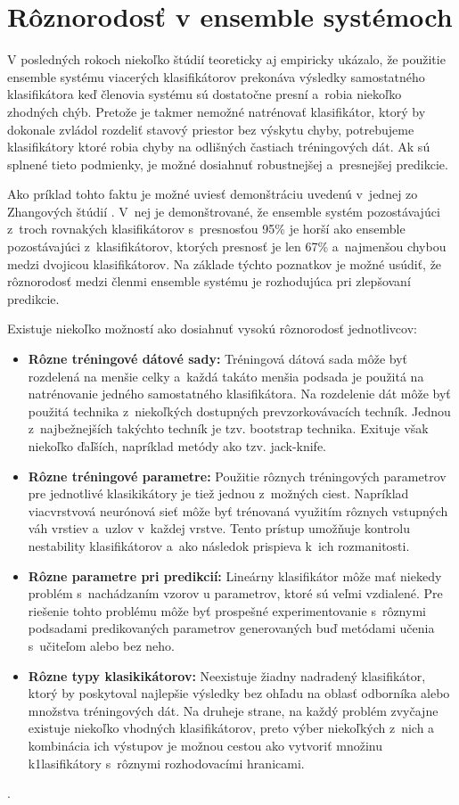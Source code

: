 \section{Rôznorodosť v ensemble systémoch}

V posledných rokoch niekoľko štúdií teoreticky \cite{teoret1} aj empiricky \cite{empiric1} ukázalo, že použitie ensemble systému viacerých klasifikátorov prekonáva výsledky samostatného klasifikátora keď členovia systému sú dostatočne presní a~robia niekoľko zhodných chýb. 
Pretože je takmer nemožné natrénovať klasifikátor, ktorý by dokonale zvládol rozdeliť stavový priestor bez výskytu chyby, potrebujeme klasifikátory ktoré robia chyby na odlišných častiach tréningových dát. Ak sú splnené tieto podmienky, je možné dosiahnuť robustnejšej a~presnejšej predikcie. 

Ako príklad tohto faktu je možné uviesť demonštráciu uvedenú v~jednej zo Zhangových štúdií \cite{zhang}. V~nej je demonštrované, že ensemble systém pozostávajúci z~troch rovnakých klasifikátorov s~presnosťou 95\% je horší ako ensemble pozostávajúci z~klasifikátorov, ktorých presnosť je len 67\% a~najmenšou chybou medzi dvojicou klasifikátorov. Na základe týchto poznatkov je možné usúdiť, že rôznorodosť medzi členmi ensemble systému je rozhodujúca pri zlepšovaní predikcie.

Existuje niekoľko možností ako dosiahnuť vysokú rôznorodosť jednotlivcov:
\begin{itemize}
	\item \textbf{Rôzne tréningové dátové sady:} Tréningová dátová sada môže byť rozdelená na menšie celky a~každá takáto menšia podsada je použitá na natrénovanie jedného samostatného klasifikátora. Na rozdelenie dát môže byť použitá technika z~niekoľkých dostupných prevzorkovávacích techník. Jednou z~najbežnejších takýchto techník je tzv. bootstrap technika. Exituje však niekoľko ďaľších, napríklad metódy ako tzv. jack-knife.
	\item \textbf{Rôzne tréningové parametre:} Použitie rôznych tréningových parametrov pre jednotlivé klasikikátory je tiež jednou z~možných ciest. Napríklad viacvrstvová neurónová sieť môže byť trénovaná využitím rôznych vstupných váh vrstiev a~uzlov v~každej vrstve. Tento prístup umožňuje kontrolu nestability klasifikátorov a~ako následok prispieva k~ich rozmanitosti. 	
	\item \textbf{Rôzne parametre pri predikcií:} Lineárny klasifikátor môže mať niekedy problém s~nachádzaním vzorov u parametrov, ktoré sú veľmi vzdialené. Pre riešenie tohto problému môže byť prospešné experimentovanie s~rôznymi podsadami predikovaných parametrov generovaných buď metódami učenia s~učiteľom alebo bez neho. \cite{}	
	\item \textbf{Rôzne typy klasikikátorov:} Neexistuje žiadny nadradený klasifikátor, ktorý by poskytoval najlepšie výsledky bez ohľadu na oblasť odborníka alebo množstva tréningových dát. Na druheje strane, na každý problém zvyčajne existuje niekoľko vhodných klasifikátorov, preto výber niekoľkých z~nich a kombinácia ich výstupov je možnou cestou ako vytvoriť množinu k1lasifikátory s~rôznymi rozhodovacími hranicami.
\end{itemize}
.

